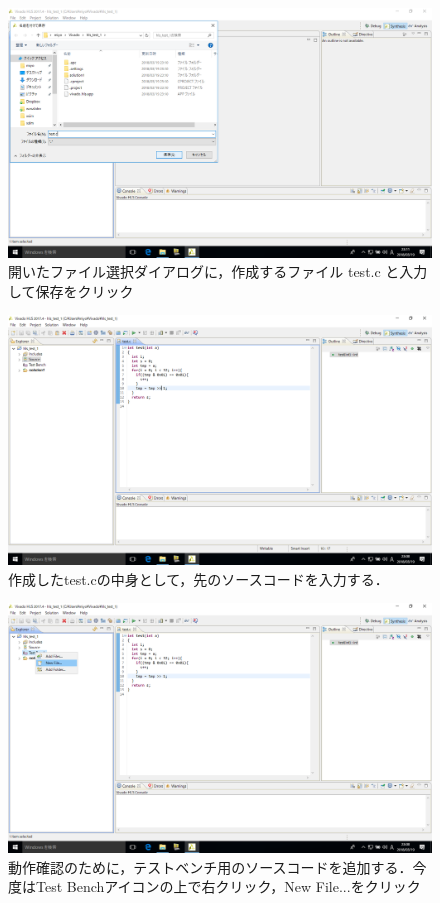 \documentclass[a4paper,dvipdfmx]{jsarticle}
\begin{document}
 \begin{figure}[H]
  \begin{center}
   \includegraphics[width=.8\textwidth]{chapter08_figures/VirtualBox_Windows10_19_03_2018_23_11_22.png}
  \end{center}
  \caption{開いたファイル選択ダイアログに，作成するファイル test.c と入力して保存をクリック}
 \end{figure}

 \begin{figure}[H]
  \begin{center}
   \includegraphics[width=.8\textwidth]{chapter08_figures/VirtualBox_Windows10_19_03_2018_23_13_38.png}
  \end{center}
  \caption{作成したtest.cの中身として，先のソースコードを入力する．}
 \end{figure}

 \begin{figure}[H]
  \begin{center}
   \includegraphics[width=.8\textwidth]{chapter08_figures/VirtualBox_Windows10_19_03_2018_23_13_47.png}
  \end{center}
  \caption{動作確認のために，テストベンチ用のソースコードを追加する．今度はTest Benchアイコンの上で右クリック，New File...をクリック }
 \end{figure}
\end{document}

